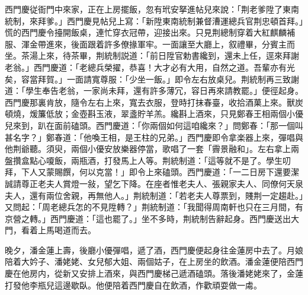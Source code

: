 西門慶従衙門中來家，正在上房擺飯，忽有玳安拏進帖兒來說：「荆老爹陞了東南統制，來拜爹。」西門慶見帖兒上寫：「新陞東南統制兼督漕運總兵官荆忠頓首拜。」慌的西門慶令擡開飯桌，連忙穿衣冠帶，迎接出來。只見荆總制穿着大紅麒麟補服、渾金帶進來，後面跟着許多僚掾軍牢。一面讓至大廳上，叙禮畢，分賓主而坐。茶湯上來，待茶畢，荆統制説道：「前日陞官勅書纔到，還未上任，逕來拜謝老翁。」西門慶道：「老總兵榮擢，恭喜！大才必有大用，自然之道。吾輩亦有光矣，容當拜賀。」一面請寬尊服：「少坐一飯。」即令左右放桌兒。荆統制再三致謝道：「學生奉告老翁，一家尚未拜，還有許多薄冗，容日再來請教罷。」便徑起身。西門慶那裏肯放，隨令左右上來，寬去衣服，登時打抹春臺，收拾酒菓上來。獸炭頓燒，煖簾低放；金壺斟玉液，翠盞貯羊羔。纔斟上酒來，只見鄭春王相兩個小優兒來到，趴在面前磕頭。西門慶道：「你兩個如何這咱纔來？」問鄭春：「那一個叫甚名字？」鄭春道：「他喚王相，是王柱的兄弟。」西門慶即令拿楽器上來，彈唱與他荆爺聽。須臾，兩個小優安放樂器停當，歌唱了一套「霽景融和」。左右拿上兩盤攢盒點心嗄飯，兩瓶酒，打發馬上人等。荆統制道：「這等就不是了。學生叨拜，下人又蒙賜饌，何以克當！」即令上來磕頭。西門慶道：「一二日房下還要潔誠請尊正老夫人賞燈一敍，望乞下降。在座者惟老夫人、張親家夫人、同僚何天泉夫人，還有兩位舍親，再無他人。」荆統制道：「若老夫人尊票到，賤荆一定趨赴。」又問起：「周老總兵怎的不見陞轉？」荆統制道：「我聞得周南軒也只在三月間，有京營之轉。」西門慶道：「這也罷了。」坐不多時，荆統制告辭起身。西門慶送出大門，看着上馬喝道而去。

晚夕，潘金蓮上壽，後廳小優彈唱，遞了酒，西門慶便起身往金蓮房中去了。月娘陪着大妗子、潘姥姥、女兒郁大姐、兩個姑子，在上房坐的飲酒。潘金蓮便陪西門慶在他房内，從新又安排上酒來，與西門慶梯己遞酒磕頭。落後潘姥姥來了，金蓮打發他李瓶兒這邊歇臥。他便陪着西門慶自在飲酒，作歡頑耍做一䖏。


